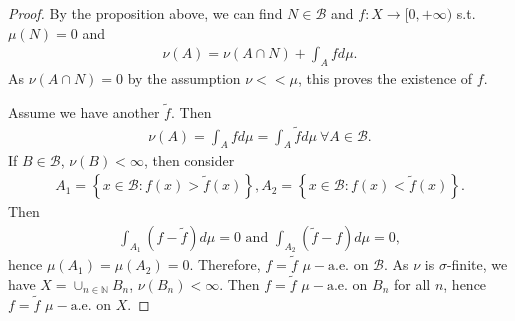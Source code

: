 \ifdetailed
\begin{proof}
    By the proposition above, we can find \(N\in\mathscr{B}\) and \(f:X\rightarrow[0,+\infty)\) s.t. \(\mu(N)=0\) and
    \begin{align*}
        \nu(A)=\nu\left(A\cap N\right) + \int_A fd\mu.
    \end{align*}
    As \(\nu(A\cap N)=0\) by the assumption \(\nu<<\mu\), this proves the existence of \(f\).
    
    Assume we have another \(\tilde{f}\). Then 
    \begin{align*}
        \nu(A)=\int_Afd\mu=\int_A\tilde{f}d\mu \ \forall A\in\mathscr{B}.
    \end{align*}
    If \(B\in\mathscr{B}\), \(\nu(B)<\infty\), then consider 
    \begin{align*}
        A_1 = \left\{x\in\mathscr{B}:f(x)>\tilde{f}(x)\right\}, A_2 = \left\{x\in\mathscr{B}:f(x)<\tilde{f}(x)\right\}. 
    \end{align*}
    Then 
    \begin{align*}
        \int_{A_1}(f-\tilde{f})d\mu = 0 \text{ and } \int_{A_2}(\tilde{f} - f) d\mu = 0,
    \end{align*}
    hence \(\mu(A_1)=\mu(A_2)=0\). Therefore, \(f=\tilde{f}\) \(\mu-\text{a.e.}\) on \(\mathscr{B}\). As \(\nu\) is \(\sigma\)-finite,
    we have \(X=\cup_{n\in\mathbb{N}}B_n\), \(\nu(B_n)<\infty\). Then \(f=\tilde{f}\) \(\mu-\text{a.e.}\) on \(B_n\) for all \(n\),
    hence \(f=\tilde{f}\) \(\mu-\text{a.e.}\) on \(X\).
\end{proof}
\fi
